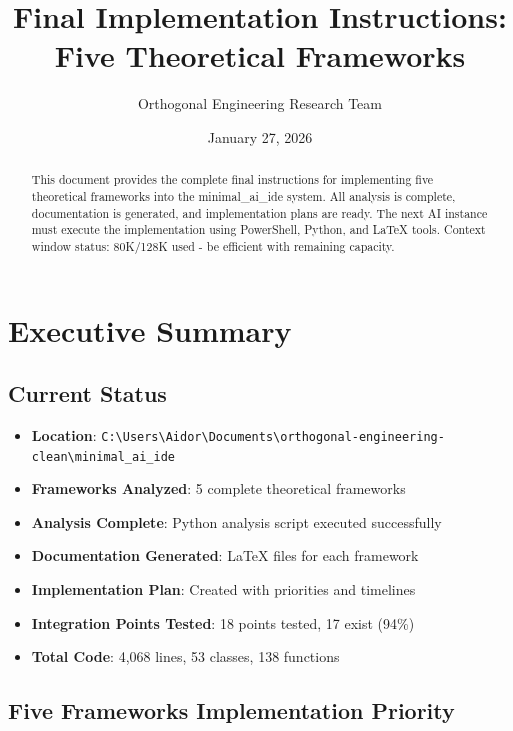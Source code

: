 \documentclass[12pt]{article}
\title{Final Implementation Instructions: Five Theoretical Frameworks}
\author{Orthogonal Engineering Research Team}
\date{January 27, 2026}
\begin{document}
\maketitle

\begin{abstract}
This document provides the complete final instructions for implementing five theoretical frameworks into the minimal\_ai\_ide system. All analysis is complete, documentation is generated, and implementation plans are ready. The next AI instance must execute the implementation using PowerShell, Python, and LaTeX tools. Context window status: 80K/128K used - be efficient with remaining capacity.
\end{abstract}

\tableofcontents

\section{Executive Summary}

\subsection{Current Status}
\begin{itemize}
    \item \textbf{Location}: \texttt{C:\textbackslash Users\textbackslash Aidor\textbackslash Documents\textbackslash orthogonal-engineering-clean\textbackslash minimal\_ai\_ide}
    \item \textbf{Frameworks Analyzed}: 5 complete theoretical frameworks
    \item \textbf{Analysis Complete}: Python analysis script executed successfully
    \item \textbf{Documentation Generated}: LaTeX files for each framework
    \item \textbf{Implementation Plan}: Created with priorities and timelines
    \item \textbf{Integration Points Tested}: 18 points tested, 17 exist (94\%)
    \item \textbf{Total Code}: 4,068 lines, 53 classes, 138 functions
\end{itemize}

\subsection{Five Frameworks Implementation Priority}
\end{document}
